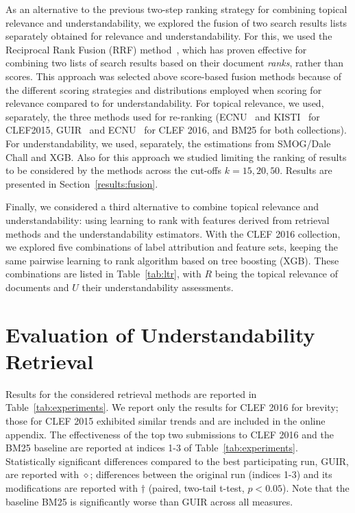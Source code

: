 As an alternative to the previous two-step ranking strategy for combining topical relevance and understandability, we explored the fusion of two search results lists separately obtained for relevance and understandability. For this, we used the Reciprocal Rank Fusion (RRF) method~\cite{cormack09}, which has proven effective for combining two lists of search results based on their document \textit{ranks}, rather than scores. This approach was selected above score-based fusion methods because of the different scoring strategies and distributions employed when scoring for relevance compared to for understandability. For topical relevance, we used, separately, the three methods used for re-ranking (ECNU~\cite{song15} and KISTI~\cite{oh15} for CLEF2015, GUIR~\cite{soldaini16} and ECNU~\cite{song16} for CLEF 2016, and BM25 for both collections). For understandability, we used, separately, the estimations from SMOG/Dale Chall and XGB. Also for this approach we studied limiting the ranking of results to be considered by the methods across the cut-offs $k=15, 20, 50$. Results are presented in Section~\ref{results:fusion}.


Finally, we considered a third alternative to combine topical relevance and understandability: using learning to rank with features derived from retrieval methods and the understandability estimators.
With the CLEF 2016 collection, we explored five combinations of label attribution and feature sets, keeping the same pairwise learning to rank algorithm based on tree boosting (XGB).
These combinations are listed in Table~\ref{tab:ltr}, with $R$ being the topical relevance of documents and $U$ their understandability assessments. 



\section{Evaluation of Understandability Retrieval}
\label{sec:results}




Results for the considered retrieval methods are reported in Table~\ref{tab:experiments}. We report only the results for CLEF 2016 for brevity; those for CLEF 2015 exhibited similar trends and are included in the online appendix. The effectiveness of the top two submissions to CLEF 2016 and the BM25 baseline are reported at indices 1-3 of Table~\ref{tab:experiments}. Statistically significant differences compared to the best participating run, GUIR, are reported with $\diamond$; differences between the original run (indices 1-3) and its modifications are reported with $\dagger$ (paired, two-tail t-test, $p<0.05$). Note that the baseline BM25 is significantly worse than GUIR across all measures. 

